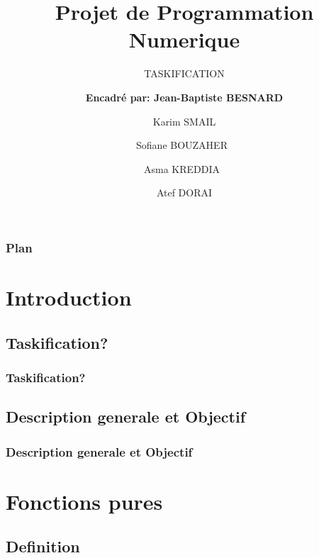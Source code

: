 \documentclass[hyperref={bookmarks=false},aspectratio=169]{beamer}
\title[]
{\bfseries{Projet de Programmation Numerique}}
\subtitle{TASKIFICATION}
\author[]
{ \textbf{Encadré par: Jean-Baptiste BESNARD} \\ \and Karim SMAIL \and Sofiane BOUZAHER\ \and Asma KREDDIA\ \and Atef DORAI }
\institute
{
   Master CHPS \\ Université de Versailles Saint Quentin
}
\begin{document}
\frame{\titlepage}  %

\begin{frame}
\frametitle{Plan}
\tableofcontents
\end{frame}

\section{Introduction}


\subsection{Taskification?}


\begin{frame}
\frametitle{Taskification?}


\end{frame}



\subsection{Description generale et Objectif}



\begin{frame}
\frametitle{Description generale et Objectif}


\end{frame}


\section{Fonctions pures}


\subsection{Definition}
\end{document}
